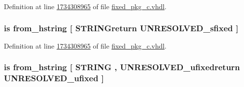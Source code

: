 Definition at line \hyperlink{fixed__pkg__c_8vhdl_source_l1734308965}{1734308965} of file \hyperlink{fixed__pkg__c_8vhdl_source}{fixed\+\_\+pkg\+\_\+c.\+vhdl}.

\hypertarget{classfixed__pkg_a77fc6c4053e07d7a80d3450a6d2b06d6}{}
\subsubsection[{from\+\_\+hex\+\_\+string}]{ {\bfseries \textcolor{keywordflow}{is}\textcolor{vhdlchar}{ }\textcolor{vhdlchar}{from\+\_\+hstring}\textcolor{vhdlchar}{ }\textcolor{vhdlchar}{\mbox{[}}\textcolor{vhdlchar}{ }\textcolor{vhdlchar}{S\+T\+R\+I\+N\+Greturn}\textcolor{vhdlchar}{ }{\bfseries {\bf U\+N\+R\+E\+S\+O\+L\+V\+E\+D\+\_\+sfixed}} \textcolor{vhdlchar}{ }\textcolor{vhdlchar}{\mbox{]}}\textcolor{vhdlchar}{ }} \hspace{0.3cm}{\ttfamily [Alias]}}\label{classfixed__pkg_a77fc6c4053e07d7a80d3450a6d2b06d6}


Definition at line \hyperlink{fixed__pkg__c_8vhdl_source_l1734308965}{1734308965} of file \hyperlink{fixed__pkg__c_8vhdl_source}{fixed\+\_\+pkg\+\_\+c.\+vhdl}.

\hypertarget{classfixed__pkg_a724add031b8c0ffca95ef99b617b552c}{}
\subsubsection[{from\+\_\+hex\+\_\+string}]{ {\bfseries \textcolor{keywordflow}{is}\textcolor{vhdlchar}{ }\textcolor{vhdlchar}{from\+\_\+hstring}\textcolor{vhdlchar}{ }\textcolor{vhdlchar}{\mbox{[}}\textcolor{vhdlchar}{ }\textcolor{comment}{S\+T\+R\+I\+N\+G}\textcolor{vhdlchar}{ }\textcolor{vhdlchar}{,}\textcolor{vhdlchar}{ }\textcolor{vhdlchar}{U\+N\+R\+E\+S\+O\+L\+V\+E\+D\+\_\+ufixedreturn}\textcolor{vhdlchar}{ }{\bfseries {\bf U\+N\+R\+E\+S\+O\+L\+V\+E\+D\+\_\+ufixed}} \textcolor{vhdlchar}{ }\textcolor{vhdlchar}{\mbox{]}}\textcolor{vhdlchar}{ }} \hspace{0.3cm}{\ttfamily [Alias]}}\label{classfixed__pkg_a724add031b8c0ffca95ef99b617b552c}


